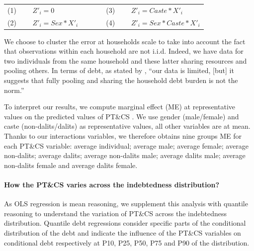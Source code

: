 \documentclass[a4paper, 11pt, onecolumn]{article}
\begin{document}
\begin{table}[h!]
  \centering
    \begin{tabular}{lllll}
    (1)~~~~ $Z'_{i}=0$ & & & & (3)~~~~ $Z'_{i}=Caste*X'_{i}$ \\
    (2)~~~~ $Z'_{i}=Sex*X'_{i}$ & & & & (4)~~~~ $Z'_{i}=Sex*Caste*X'_{i}$ \\
    \end{tabular}%
\end{table}%

We choose to cluster the error at households scale to take into account the fact that observations within each household are not i.i.d.
Indeed, we have data for two individuals from the same household and these latter sharing resources and pooling others.%
In terms of debt, as stated by \cite{Reboul2021}, ``our data is limited, [but] it suggests that fully pooling and sharing the household debt burden is not the norm.''

To interpret our results, we compute marginal effect (ME) at representative values on the predicted values of PT\&CS \cite{Williams2012}.
We use gender (male/female) and caste (non-dalits/dalits) as representative values, all other variables are at mean.
Thanks to our interactions variables, we therefore obtains nine groups ME for each PT\&CS variable: average individual; average male; average female; average non-dalits; average dalits; average non-dalits male; average dalits male; average non-dalits female and average dalits female. 

\paragraph{How the PT\&CS varies across the indebtedness distribution?}
As OLS regression is mean reasoning, we supplement this analysis with quantile reasoning to understand the variation of PT\&CS across the indebtedness distribution.
Quantile debt regressions consider specific parts of the conditional distribution of the debt and indicate the influence of the PT\&CS variables on conditional debt respectively at P10, P25, P50, P75 and P90 of the distribution.
\end{document}
